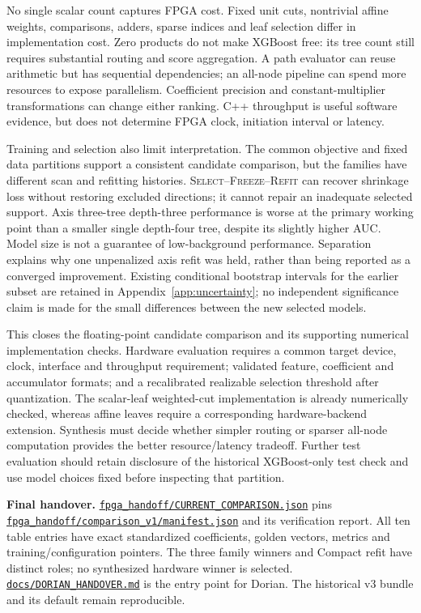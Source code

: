 \documentclass[11pt,a4paper]{article}
\newcommand{\file}[1]{\href{https://github.com/HephyAnalysisSW/oblique-tree-benchmark/blob/main/#1}{\nolinkurl{#1}}}
\newcommand{\SFR}{\textsc{Select--Freeze--Refit}}
\begin{document}
No single scalar count captures FPGA cost. Fixed unit cuts, nontrivial affine
weights, comparisons, adders, sparse indices and leaf selection differ in
implementation cost. Zero products do not make XGBoost free: its tree count
still requires substantial routing and score aggregation. A path evaluator
can reuse arithmetic but has sequential dependencies; an all-node pipeline
can spend more resources to expose parallelism. Coefficient precision and
constant-multiplier transformations can change either ranking. C++ throughput
is useful software evidence, but does not determine FPGA clock, initiation
interval or latency.

Training and selection also limit interpretation. The common objective and
fixed data partitions support a consistent candidate comparison, but the
families have different scan and refitting histories. \SFR{} can recover
shrinkage loss without restoring excluded directions; it cannot repair an
inadequate selected support. Axis three-tree depth-three performance is worse
at the primary working point than a smaller single depth-four tree, despite
its slightly higher AUC. Model size is not a guarantee of low-background
performance. Separation explains why one unpenalized axis refit was held,
rather than being reported as a converged improvement. Existing conditional
bootstrap intervals for the earlier subset are retained in
Appendix~\ref{app:uncertainty}; no independent significance claim is made for
the small differences between the new selected models.

This closes the floating-point candidate comparison and its supporting
numerical implementation checks. Hardware evaluation requires a common target
device, clock, interface and throughput requirement; validated feature,
coefficient and accumulator formats; and a recalibrated realizable selection
threshold after quantization. The scalar-leaf weighted-cut implementation is
already numerically checked, whereas affine leaves require a corresponding
hardware-backend extension. Synthesis must decide whether simpler routing or
sparser all-node computation provides the better resource/latency tradeoff.
Further test evaluation should retain disclosure of the historical XGBoost-only
test check and use model choices fixed before inspecting that partition.

\begin{implementation}
\textbf{Final handover.} \file{fpga_handoff/CURRENT_COMPARISON.json} pins
\file{fpga_handoff/comparison_v1/manifest.json} and its verification report.
All ten table entries have exact standardized coefficients, golden vectors,
metrics and training/configuration pointers. The three family winners and
Compact refit have distinct roles; no synthesized hardware winner is selected.
\file{docs/DORIAN_HANDOVER.md} is the entry point for Dorian.
The historical v3 bundle and its default remain reproducible.
\end{implementation}
\end{document}

